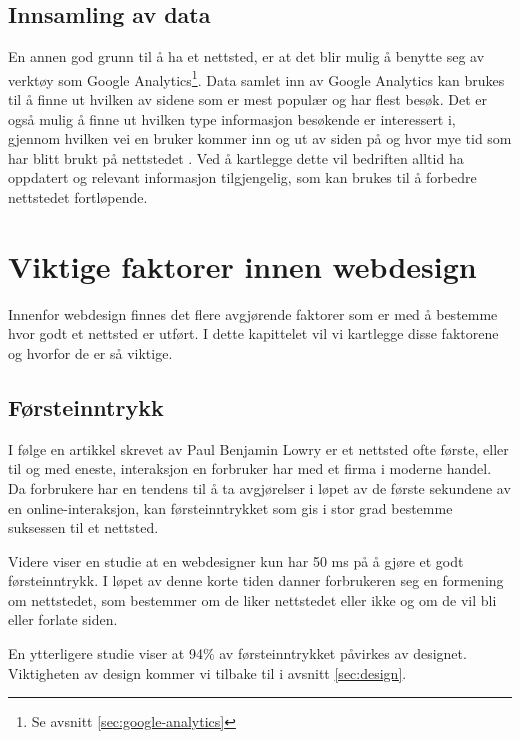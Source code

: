 \subsection{Innsamling av data}
En annen god grunn til å ha et nettsted, er at det blir mulig å benytte seg av verktøy som Google Analytics\footnote{Se avsnitt \ref{sec:google-analytics}}. Data samlet inn av Google Analytics kan brukes til å finne ut hvilken av sidene som er mest populær og har flest besøk. Det er også mulig å finne ut hvilken type informasjon besøkende er interessert i, gjennom hvilken vei en bruker kommer inn og ut av siden på og hvor mye tid som har blitt brukt på nettstedet \cite{kent2011lwa}. Ved å kartlegge dette vil bedriften alltid ha oppdatert og relevant informasjon tilgjengelig, som kan brukes til å forbedre nettstedet fortløpende. 



\section{Viktige faktorer innen webdesign}
\label{sec:viktige-faktorer}
Innenfor webdesign finnes det flere avgjørende faktorer som er med å bestemme hvor godt et nettsted er utført. I dette kapittelet vil vi kartlegge disse faktorene og hvorfor de er så viktige.


\subsection{Førsteinntrykk}
I følge en artikkel skrevet av Paul Benjamin Lowry \cite{lowry2014pis} er et nettsted ofte første, eller til og med eneste, interaksjon en forbruker har med et firma i moderne handel. Da forbrukere har en tendens til å ta avgjørelser i løpet av de første sekundene av en online-interaksjon, kan førsteinntrykket som gis i stor grad bestemme suksessen til et nettsted. 

Videre viser en studie \cite{lindgaard2006awd} at en webdesigner kun har 50 ms på å gjøre et godt førsteinntrykk.
I løpet av denne korte tiden danner forbrukeren seg en formening om nettstedet, som bestemmer om de liker nettstedet eller ikke og om de vil bli eller forlate siden.

En ytterligere studie \cite{sillence2004tam} viser at 94\% av førsteinntrykket påvirkes av designet.
Viktigheten av design kommer vi tilbake til i avsnitt \ref{sec:design}.


